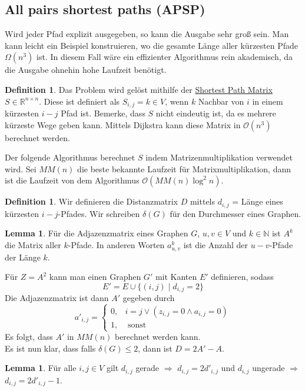 \documentclass[a4paper, 12pt]{article}
\theoremstyle{plain}
\theoremstyle{definition}
\newtheorem{definition}[theorem]{Definition} %
\theoremstyle{lemma}
\newtheorem{lemma}[theorem]{Lemma}
\theoremstyle{remark}
\theoremstyle{corollary}
\theoremstyle{example}
\begin{document}
	\subsection{All pairs shortest paths (APSP)}
	Wird jeder Pfad explizit ausgegeben, so kann die Ausgabe sehr groß sein. Man kann leicht ein Beispiel konstruieren, wo die gesamte Länge aller kürzesten Pfade $\Omega(n^3)$ ist. In diesem Fall wäre ein effizienter Algorithmus rein akademisch, da die Ausgabe ohnehin hohe Laufzeit benötigt.\\
	\begin{definition}
		Das Problem wird gelöst mithilfe der \underline{Shortest Path Matrix} $S \in \mathbb{R}^{n\times n}$. Diese ist definiert als $S_{i,j} = k \in V$, wenn $k$ Nachbar von $i$ in einem kürzesten $i-j$ Pfad ist. Bemerke, dass $S$ nicht eindeutig ist, da es mehrere kürzeste Wege geben kann. Mittels Dijkstra kann diese Matrix in $\mathcal{O}(n^3)$ berechnet werden. 
	\end{definition}
	Der folgende Algorithmus berechnet $S$ indem Matrizenmultiplikation verwendet wird. Sei $MM(n)$ die beste bekannte Laufzeit für Matrixmultiplikation, dann ist die Laufzeit von dem Algorithmus $\mathcal{O}(MM(n)\log^2 n)$. 
	\begin{definition}
		Wir definieren die Distanzmatrix $D$ mittels $d_{i,j}$ = Länge eines kürzesten $i-j$-Pfades. Wir schreiben $\delta(G)$ für den Durchmesser eines Graphen.
	\end{definition}
	\begin{lemma}
		Für die Adjazenzmatrix eines Graphen $G$, $u,v \in V$ und $k \in \mathbb{N}$ ist $A^k$ die Matrix aller $k$-Pfade. In anderen Worten $a^k_{u,v}$ ist die Anzahl der $u-v$-Pfade der Länge $k$.
	\end{lemma}
	Für $Z=A^2$ kann man einen Graphen $G'$ mit Kanten $E'$ definieren, sodass \[E' = E \cup \{(i,j) \mid d_{i,j} = 2\}\] Die Adjazenzmatrix ist dann $A'$ gegeben durch \[a'_{i,j} = \begin{cases}
		0, & i=j \lor (z_{i,j} = 0 \land a_{i,j} = 0)\\
		1, & \text{ sonst}
	\end{cases}\]
	Es folgt, dass $A'$ in $MM(n)$ berechnet werden kann.\\
	Es ist nun klar, dass falls $\delta(G) \leq 2$, dann ist $D=2A'-A$.
	\begin{lemma}
		Für alle $i,j \in V$ gilt $d_{i,j}$ gerade $\Rightarrow$ $d_{i,j} = 2d'_{i,j}$ und $d_{i,j}$ ungerade $\Rightarrow$ $d_{i,j} = 2d'_{i,j}-1$.
	\end{lemma}
\end{document}
